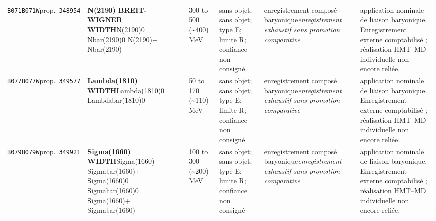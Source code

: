 \begin{landscape}
\begin{longtable}{L{1.85cm}L{4.45cm}L{2.35cm}L{4.05cm}L{3.35cm}L{7.15cm}}
\texttt{B071}\newline \texttt{B071W}\newline prop.\ \texttt{348954} & \textbf{N(2190) BREIT-WIGNER WIDTH}\newline N(2190)0 \textbar{}\allowbreak{} Nbar(2190)0 \textbar{}\allowbreak{} N(2190)+ \textbar{}\allowbreak{} Nbar(2190)- & 300 to 500 (\textasciitilde{}400)\,MeV & sans objet; sans objet; type E; limite R; confiance non consigné & enregistrement composé baryonique\newline \emph{enregistrement exhaustif sans promotion comparative} & application nominale de liaison baryonique. Enregistrement externe comptabilisé ; réalisation HMT--MD individuelle non encore reliée. \\
\texttt{B077}\newline \texttt{B077W}\newline prop.\ \texttt{349577} & \textbf{Lambda(1810) WIDTH}\newline Lambda(1810)0 \textbar{}\allowbreak{} Lambdabar(1810)0 & 50 to 170 (\textasciitilde{}110)\,MeV & sans objet; sans objet; type E; limite R; confiance non consigné & enregistrement composé baryonique\newline \emph{enregistrement exhaustif sans promotion comparative} & application nominale de liaison baryonique. Enregistrement externe comptabilisé ; réalisation HMT--MD individuelle non encore reliée. \\
\texttt{B079}\newline \texttt{B079W}\newline prop.\ \texttt{349921} & \textbf{Sigma(1660) WIDTH}\newline Sigma(1660)- \textbar{}\allowbreak{} Sigmabar(1660)+ \textbar{}\allowbreak{} Sigma(1660)0 \textbar{}\allowbreak{} Sigmabar(1660)0 \textbar{}\allowbreak{} Sigma(1660)+ \textbar{}\allowbreak{} Sigmabar(1660)- & 100 to 300 (\textasciitilde{}200)\,MeV & sans objet; sans objet; type E; limite R; confiance non consigné & enregistrement composé baryonique\newline \emph{enregistrement exhaustif sans promotion comparative} & application nominale de liaison baryonique. Enregistrement externe comptabilisé ; réalisation HMT--MD individuelle non encore reliée. \\

\end{longtable}
\end{landscape}
